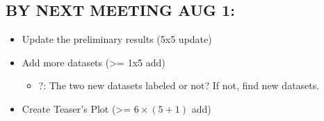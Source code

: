 \begin{multicols}{2}
\subsection*{BY NEXT MEETING AUG 1:}
\begin{itemize}
    \item Update the preliminary results (5x5 update)
    \item Add more datasets (>= 1x5 add)
    \begin{itemize}
        \item ?: The two new datasets labeled or not? If not, find new datasets.
    \end{itemize}
    \item Create Teaser’s Plot (>= \( 6 \times (5 + 1) \) add)
\end{itemize}

\end{multicols}

\newpage